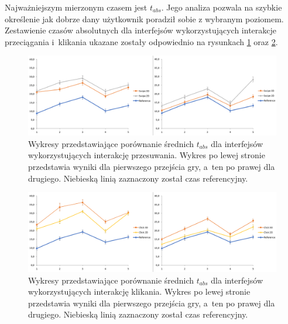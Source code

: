 \documentclass[a4paper,12pt,numbers=noenddot]{report}
\begin{document}
Najważniejszym mierzonym czasem jest $t_{abs}$. Jego analiza pozwala na szybkie określenie jak dobrze dany użytkownik poradził sobie z wybranym poziomem. Zestawienie czasów absolutnych dla interfejsów wykorzystujących interakcje przeciągania i~klikania ukazane zostały odpowiednio na rysunkach \ref{fig:diag:tAbs_swipe12} oraz \ref{fig:diag:tAbs_click12}.

\begin{figure}[h!]
	\centering
  	\includegraphics[width=\linewidth]{diag/tAbs_swipe12.png}
	\caption{Wykresy przedstawiające porównanie średnich $t_{abs}$ dla interfejsów wykorzystujących interakcję przesuwania. Wykres po lewej stronie przedstawia wyniki dla pierwszego przejścia gry, a~ten po prawej dla drugiego. Niebieską linią zaznaczony został czas referencyjny.}
	\label{fig:diag:tAbs_swipe12}
\end{figure}

\begin{figure}[h!]
	\centering
  	\includegraphics[width=\linewidth]{diag/tAbs_click12.png}
	\caption{Wykresy przedstawiające porównanie średnich $t_{abs}$ dla interfejsów wykorzystujących interakcję klikania. Wykres po lewej stronie przedstawia wyniki dla pierwszego przejścia gry, a~ten po prawej dla drugiego. Niebieską linią zaznaczony został czas referencyjny.}
	\label{fig:diag:tAbs_click12}
\end{figure}
\end{document}
